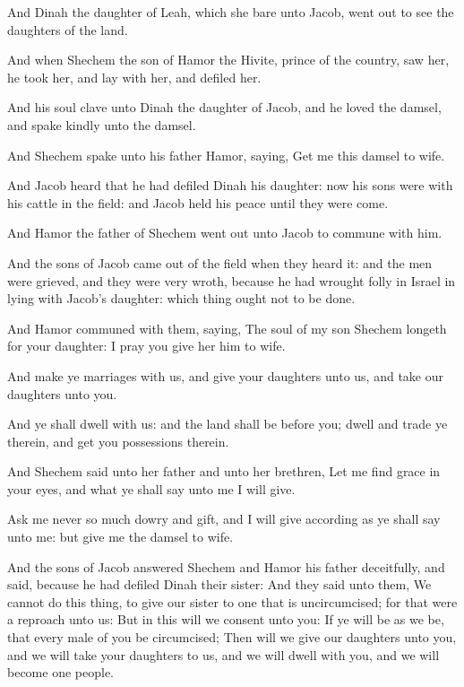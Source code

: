 \Chapter
\Verse And Dinah the daughter of Leah, which she bare unto Jacob, went out to see the daughters of the land.

\Verse And when Shechem the son of Hamor the Hivite, prince of the country, saw her, he took her, and lay with her, and defiled her.

\Verse And his soul clave unto Dinah the daughter of Jacob, and he loved the damsel, and spake kindly unto the damsel.

\Verse And Shechem spake unto his father Hamor, saying, Get me this damsel to wife.

\Verse And Jacob heard that he had defiled Dinah his daughter: now his sons were with his cattle in the field: and Jacob held his peace until they were come.

\Verse And Hamor the father of Shechem went out unto Jacob to commune with him.

\Verse And the sons of Jacob came out of the field when they heard it: and the men were grieved, and they were very wroth, because he had wrought folly in Israel in lying with Jacob's daughter: which thing ought not to be done.

\Verse And Hamor communed with them, saying, The soul of my son Shechem longeth for your daughter: I pray you give her him to wife.

\Verse And make ye marriages with us, and give your daughters unto us, and take our daughters unto you.

\Verse And ye shall dwell with us: and the land shall be before you; dwell and trade ye therein, and get you possessions therein.

\Verse And Shechem said unto her father and unto her brethren, Let me find grace in your eyes, and what ye shall say unto me I will give.

\Verse Ask me never so much dowry and gift, and I will give according as ye shall say unto me: but give me the damsel to wife.

\Verse And the sons of Jacob answered Shechem and Hamor his father deceitfully, and said, because he had defiled Dinah their sister: \Verse And they said unto them, We cannot do this thing, to give our sister to one that is uncircumcised; for that were a reproach unto us: \Verse But in this will we consent unto you: If ye will be as we be, that every male of you be circumcised; \Verse Then will we give our daughters unto you, and we will take your daughters to us, and we will dwell with you, and we will become one people.

